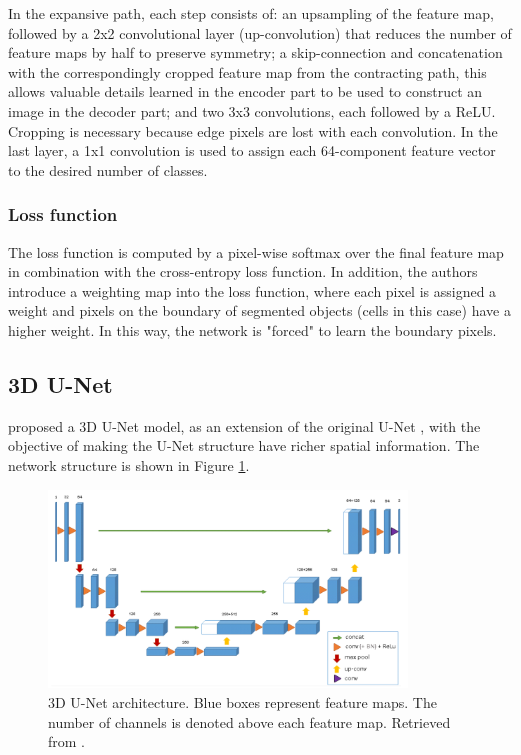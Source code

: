 In the expansive path, each step consists of: an upsampling of the feature map, followed by a 2x2 convolutional layer (up-convolution) that reduces the number of feature maps by half to preserve symmetry; a skip-connection and concatenation with the correspondingly cropped feature map from the contracting path, this allows valuable details learned in the encoder part to be used to construct an image in the decoder part; and two 3x3 convolutions, each followed by a \ac{ReLU}. Cropping is necessary because edge pixels are lost with each convolution. In the last layer, a 1x1 convolution is used to assign each 64-component feature vector to the desired number of classes.


\subsubsection*{Loss function}

The loss function is computed by a pixel-wise softmax over the final feature map in combination with the cross-entropy loss function. In addition, the authors introduce a weighting map into the loss function, where each pixel is assigned a weight and pixels on the boundary of segmented objects (cells in this case) have a higher weight. In this way, the network is "forced" to learn the boundary pixels.

\subsection{3D U-Net}
\label{subsection:3dunet}

\citet{Unet:3D} proposed a \ac{3D} U-Net model, as an extension of the original U-Net \cite{Unet:2D}, with the objective of making the U-Net structure have richer spatial information. The network structure is shown in Figure \ref{fig:3dUnet}. 

\begin{figure}[!htb]
  \centering
  \includegraphics[width=0.85\textwidth]{Images/3dunet.jpg}
  \caption[\ac{3D} U-Net architecture. Blue boxes represent feature maps. The number of channels is denoted above each feature map.]{\ac{3D} U-Net architecture. Blue boxes represent feature maps. The number of channels is denoted above each feature map. Retrieved from \cite{Unet:3D}.}
  \label{fig:3dUnet}
\end{figure}

